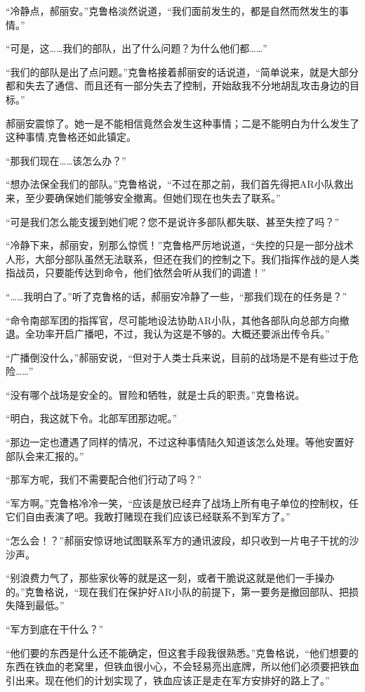 “冷静点，郝丽安。”克鲁格淡然说道，“我们面前发生的，都是自然而然发生的事情。”

“可是，这……我们的部队，出了什么问题？为什么他们都……”

“我们的部队是出了点问题。”克鲁格接着郝丽安的话说道，“简单说来，就是大部分都和失去了通信、而且还有一部分失去了控制，开始敌我不分地胡乱攻击身边的目标。”

郝丽安震惊了。她一是不能相信竟然会发生这种事情；二是不能明白为什么发生了这种事情,克鲁格还如此镇定。

“那我们现在……该怎么办？”

“想办法保全我们的部队。”克鲁格说，“不过在那之前，我们首先得把AR小队救出来，至少要确保她们能够安全撤离。但她们现在也失去了联系。”

“可是我们怎么能支援到她们呢？您不是说许多部队都失联、甚至失控了吗？”

“冷静下来，郝丽安，别那么惊慌！”克鲁格严厉地说道，“失控的只是一部分战术人形，大部分部队虽然无法联系，但还在我们的控制之下。我们指挥作战的是人类指战员，只要能传达到命令，他们依然会听从我们的调遣！”

“……我明白了。”听了克鲁格的话，郝丽安冷静了一些，“那我们现在的任务是？”

“命令南部军团的指挥官，尽可能地设法协助AR小队，其他各部队向总部方向撤退。全功率开启广播吧，不过，我认为这是不够的。大概还要派出传令兵。”

“广播倒没什么，”郝丽安说，“但对于人类士兵来说，目前的战场是不是有些过于危险……”

“没有哪个战场是安全的。冒险和牺牲，就是士兵的职责。”克鲁格说。

“明白，我这就下令。北部军团那边呢。”

“那边一定也遭遇了同样的情况，不过这种事情陆久知道该怎么处理。等他安置好部队会来汇报的。”

“那军方呢，我们不需要配合他们行动了吗？”

“军方啊。”克鲁格冷冷一笑，“应该是放已经弃了战场上所有电子单位的控制权，任它们自由表演了吧。我敢打赌现在我们应该已经联系不到军方了。”

“怎么会！？”郝丽安惊讶地试图联系军方的通讯波段，却只收到一片电子干扰的沙沙声。

“别浪费力气了，那些家伙等的就是这一刻，或者干脆说这就是他们一手操办的。”克鲁格说，“现在我们在保护好AR小队的前提下，第一要务是撤回部队、把损失降到最低。”

“军方到底在干什么？”

“他们要的东西是什么还不能确定，但这套手段我很熟悉。”克鲁格说，“他们想要的东西在铁血的老窝里，但铁血很小心，不会轻易亮出底牌，所以他们必须要把铁血引出来。现在他们的计划实现了，铁血应该正是走在军方安排好的路上了。”

